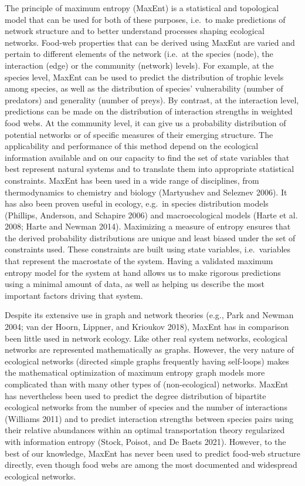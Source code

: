 \documentclass[11pt]{article}
\begin{document}
The principle of maximum entropy (MaxEnt) is a statistical and
topological model that can be used for both of these purposes, i.e.~to
make predictions of network structure and to better understand processes
shaping ecological networks. Food-web properties that can be derived
using MaxEnt are varied and pertain to different elements of the network
(i.e.~at the species (node), the interaction (edge) or the community
(network) levels). For example, at the species level, MaxEnt can be used
to predict the distribution of trophic levels among species, as well as
the distribution of species' vulnerability (number of predators) and
generality (number of preys). By contrast, at the interaction level,
predictions can be made on the distribution of interaction strengths in
weighted food webs. At the community level, it can give us a probability
distribution of potential networks or of specific measures of their
emerging structure. The applicability and performance of this method
depend on the ecological information available and on our capacity to
find the set of state variables that best represent natural systems and
to translate them into appropriate statistical constraints. MaxEnt has
been used in a wide range of disciplines, from thermodynamics to
chemistry and biology (Martyushev and Seleznev 2006). It has also been
proven useful in ecology, e.g.~in species distribution models (Phillips,
Anderson, and Schapire 2006) and macroecological models (Harte et al.
2008; Harte and Newman 2014). Maximizing a measure of entropy ensures
that the derived probability distributions are unique and least biased
under the set of constraints used. These constraints are built using
state variables, i.e.~variables that represent the macrostate of the
system. Having a validated maximum entropy model for the system at hand
allows us to make rigorous predictions using a minimal amount of data,
as well as helping us describe the most important factors driving that
system.

Despite its extensive use in graph and network theories (e.g., Park and
Newman 2004; van der Hoorn, Lippner, and Krioukov 2018), MaxEnt has in
comparison been little used in network ecology. Like other real system
networks, ecological networks are represented mathematically as graphs.
However, the very nature of ecological networks (directed simple graphs
frequently having self-loops) makes the mathematical optimization of
maximum entropy graph models more complicated than with many other types
of (non-ecological) networks. MaxEnt has nevertheless been used to
predict the degree distribution of bipartite ecological networks from
the number of species and the number of interactions (Williams 2011) and
to predict interaction strengths between species pairs using their
relative abundances within an optimal transportation theory regularized
with information entropy (Stock, Poisot, and De Baets 2021). However, to
the best of our knowledge, MaxEnt has never been used to predict
food-web structure directly, even though food webs are among the most
documented and widespread ecological networks.
\end{document}
